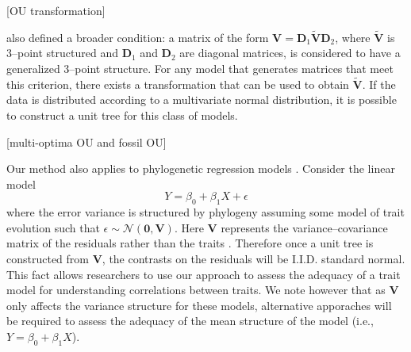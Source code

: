 \documentclass[a4paper,11pt]{article}
\begin{document}
[OU transformation]

\citet{Ho2014} also defined a broader condition: a matrix of the form $\mathbf{V}=\mathbf{D}_1 \widetilde{\mathbf{V}}\mathbf{D}_2$, where $\widetilde{\mathbf{V}}$ is 3--point structured and $\mathbf{D}_1$ and $\mathbf{D}_2$ are diagonal matrices, is considered to have a generalized 3--point structure. For any model that generates matrices that meet this criterion, there exists a transformation that can be used to obtain $\widetilde{\mathbf{V}}$. If the data is distributed according to a multivariate normal distribution, it is possible to construct a unit tree for this class of models.

[multi-optima OU and fossil OU] 

Our method also applies to phylogenetic regression models \citep{Grafen1989, MartinsHansen1997}. Consider the linear model
\[Y = \beta_0 + \beta_1 X + \epsilon\]
where the error variance is structured by phylogeny assuming some model of trait evolution such that $\epsilon \sim \mathcal{N}(\mathbf{0}, \mathbf{V})$. Here $\mathbf{V}$ represents the variance--covariance matrix of the residuals rather than the traits \citep{Rohlf2001}. Therefore once a unit tree is constructed from $\mathbf{V}$, the contrasts on the residuals will be I.I.D. standard normal. This fact allows researchers to use our approach to assess the adequacy of a trait model for understanding correlations between traits. We note however that as $\mathbf{V}$ only affects the variance structure for these models, alternative apporaches \citep[see for example][ch. 6]{Gelman2003} will be required to assess the adequacy of the mean structure of the model (i.e., $Y = \beta_0 + \beta_1X$).



\end{document}
